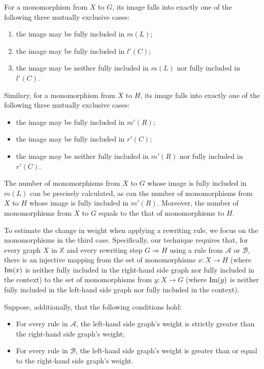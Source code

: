 For a monomorphism from $X$ to $G$, its image falls into exactly one of the following three mutually exclusive cases:
\begin{enumerate}
    \item the image may be fully included in $m(L)$;
    \item the image may be fully included in $l'(C)$; 
    \item the image may be neither fully included in $m(L)$ nor fully included in $l'(C)$.
\end{enumerate} 
 Similary, for a monomorphism from $X$ to $H$, its image falls into exactly one of the following three mutually exclusive cases:
 \begin{itemize}
    \item the image may be fully included in $m'(R)$;
    \item the image may be fully included in $r'(C)$;
    \item the image may be neither fully included in $m'(R)$ nor fully included in $r'(C)$.
 \end{itemize}
  The number of monomorphisms from $X$ to $G$ whose image is fully included in $m(L)$ can be precisely calculated, as can the number of monomorphisms from $X$ to $H$ whose image is fully included in $m'(R)$. Moreover, the number of monomorphisms from $X$ to $G$ equals to the that of monomorphisms to $H$. 

To estimate the change in weight when applying a rewriting rule, we focus on 
the monomorphisms in the third case. Specifically, our technique requires that, for every graph $X$ in $\mathbb{X}$ and every rewriting step $G \mathop{\Rightarrow} H$ using a rule from $\mathcal{A}$ or $\mathcal{B}$, there is an injective mapping from the set of monomorphisms $x : X \mathop{\to} H$ (where $\operatorname{Im}(x)$ is neither fully included in the right-hand side graph nor fully included in the context) to the set of monomorphisms from $y : X \mathop{\to} G$ (where $\operatorname{Im}(y)$ is neither fully included in the left-hand side graph nor fully included in the context). 

Suppose, additionally, that the following conditions hold: 
\begin{itemize}
    \item For every rule in \( \mathcal{A} \), the left-hand side graph's weight is strictly greater than the right-hand side graph's weight; 
    \item For every rule in \( \mathcal{B} \), the left-hand side graph's weight is greater than or equal to the right-hand side graph's weight.
\end{itemize}

